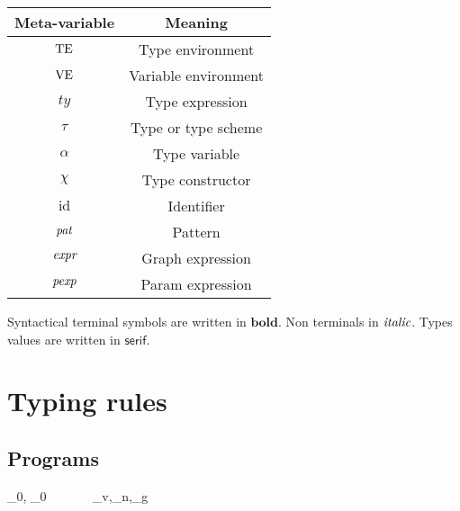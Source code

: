 \begin{center}
\begin{tabular}[c]{c|c}
  \textbf{Meta-variable} & \textbf{Meaning} \\ \hline
  $\text{TE}$         & Type environment \\ 
  $\text{VE}$         & Variable environment \\ 
  $ty$          & Type expression \\ 
  $\tau$        & Type or type scheme\\ 
  $\alpha$      & Type variable \\ 
   $\chi$           & Type constructor \\ 
   $\text{id}$    & Identifier \\ 
   $\emph{pat}$   & Pattern \\ 
  $\emph{expr}$   & Graph expression \\ 
   $\emph{pexp}$   & Param expression
\end{tabular}
\end{center}

\medskip
Syntactical terminal symbols are written in $\mathbf{bold}$. Non terminals in $\emph{italic}$. Types
values are written in $\mathsf{serif}$.

\section{Typing rules}
\label{sec:typing-rules}

\subsection{Programs}
\label{sec:typing-progr}


{\TE_0, \VE_0 \vdash {} ~ ~
  ~ ~ \gives \VE_v,\VE_n,\VE_g}

